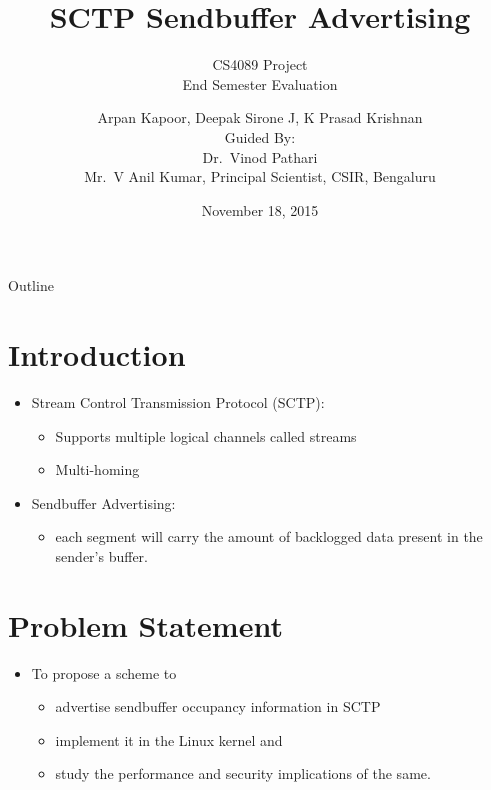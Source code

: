 \documentclass{beamer}
\title{SCTP Sendbuffer Advertising}
\subtitle{CS4089 Project\\
	End Semester Evaluation}
\author{Arpan Kapoor, Deepak Sirone J, K Prasad Krishnan\\
	Guided By:\\ Dr.~Vinod Pathari\\
	Mr.~V Anil Kumar, Principal Scientist, CSIR, Bengaluru}
\date{November 18, 2015}
\begin{document}
\begin{frame}
	\titlepage
\end{frame}

\begin{frame}{Outline}
	\tableofcontents
\end{frame}

\section{Introduction}
\begin{frame}{\insertsection}

\begin{itemize}
	\item Stream Control Transmission Protocol (SCTP):
	\begin{itemize}
		\item Supports multiple logical channels called streams
		\item Multi-homing
	\end{itemize}
\end{itemize}

\begin{itemize}
	\item Sendbuffer Advertising:
	\begin{itemize}
		\item each segment will carry the amount of backlogged data
			present in the sender's buffer.
	\end{itemize}
\end{itemize}

\end{frame}

\section{Problem Statement}
\begin{frame}{\insertsection}
\begin{itemize}
\item To propose a scheme to
\begin{itemize}
\item advertise sendbuffer occupancy information in SCTP
\item implement it in the Linux kernel and
\item study the performance and security implications of the same.
\end{itemize}
\end{itemize}
\end{frame}
\end{document}
